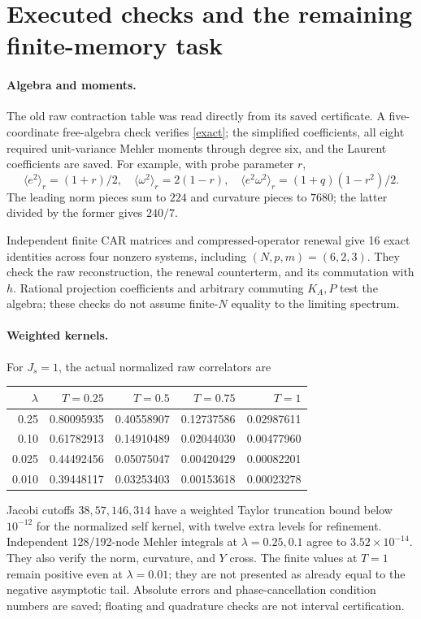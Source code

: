 \documentclass[11pt,a4paper]{article}
\newcommand{\J}{J_s}
\begin{document}
\newpage
\section{Executed checks and the remaining finite-memory task}
\paragraph{Algebra and moments.}
The old raw contraction table was read directly from its saved
certificate. A five-coordinate free-algebra check verifies
\eqref{exact}; the simplified coefficients, all eight required
unit-variance Mehler moments through degree six, and the Laurent
coefficients are saved. For example, with probe parameter $r$,
\begin{equation}
 \langle e^2\rangle_r=(1+r)/2,\quad
 \langle\omega^2\rangle_r=2(1-r),\quad
 \langle e^2\omega^2\rangle_r=(1+q)(1-r^2)/2.
\end{equation}
The leading norm pieces sum to $224$ and curvature pieces to $7680$;
the latter divided by the former gives $240/7$.

Independent finite CAR matrices and compressed-operator renewal
give 16 exact identities across four nonzero systems, including
$(N,p,m)=(6,2,3)$. They check the raw reconstruction, the renewal
counterterm, and its commutation with $h$. Rational projection
coefficients and arbitrary commuting $K_A,P$ test the algebra;
these checks do not assume finite-$N$ equality to the limiting spectrum.

\paragraph{Weighted kernels.}
For $\J=1$, the actual normalized raw correlators are
\begin{center}\small
\begin{tabular}{r|rrrr}
\toprule
$\lambda$&$T=0.25$&$T=0.5$&$T=0.75$&$T=1$\\\midrule
0.25&0.80095935&0.40558907&0.12737586&0.02987611\\
0.10&0.61782913&0.14910489&0.02044030&0.00477960\\
0.025&0.44492456&0.05075047&0.00420429&0.00082201\\
0.010&0.39448117&0.03253403&0.00153618&0.00023278\\
\bottomrule
\end{tabular}
\end{center}
Jacobi cutoffs $38,57,146,314$ have a weighted Taylor truncation
bound below $10^{-12}$ for the normalized self kernel, with twelve
extra levels for refinement. Independent 128/192-node Mehler
integrals at $\lambda=0.25,0.1$ agree to $3.52\times10^{-14}$.
They also verify the norm, curvature, and $Y$ cross. The finite
values at $T=1$ remain positive even at $\lambda=0.01$; they are
not presented as already equal to the negative asymptotic tail.
Absolute errors and phase-cancellation condition numbers are saved;
floating and quadrature checks are not interval certification.
\end{document}
